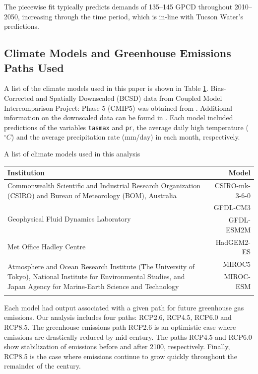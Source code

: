 \documentclass[opre,nonblindrev]{informs3} %
\begin{document}
The piecewise fit typically predicts demands of 135--145 GPCD throughout 2010--2050, increasing through the time period, which is in-line with Tucson Water's predictions.


\subsection{Climate Models and Greenhouse Emissions Paths Used}

A list of the climate models used in this paper is shown in Table \ref{tb:climate_models}.
Bias-Corrected and Spatially Downscaled (BCSD) data from Coupled Model Intercomparison Project: Phase 5 (CMIP5) was obtained from \citep{cmip5}.
Additional information on the downscaled data can be found in \citep{bcsdreclamation}.
Each model included predictions of the variables \texttt{tasmax} and \texttt{pr}, the average daily high temperature ($^\circ C$) and the average precipitation rate (mm/day) in each month, respectively.

\begin{table}
	\TABLE
	{
		A list of climate models used in this analysis
		\label{tb:climate_models}
	}
	{\begin{tabular}{p{}|r}
		\hline
		Institution & Model \\
		\hline
		\hline
		Commonwealth Scientific and Industrial Research Organization (CSIRO) and Bureau of Meteorology (BOM), Australia & CSIRO-mk-3-6-0 \\
		\hline
		\multirow{2}{*}{Geophysical Fluid Dynamics Laboratory} & GFDL-CM3 \\
		 & GFDL-ESM2M \\
		\hline
		Met Office Hadley Centre & HadGEM2-ES \\
		\hline
		\multirow{3}{*}{\vbox{Atmosphere and Ocean Research Institute (The University of Tokyo), National Institute for Environmental Studies, and Japan Agency for Marine-Earth Science and Technology}}  & MIROC5 \\
		 & MIROC-ESM \\
		 & \\
		\hline
	\end{tabular}}
	{}
\end{table}

Each model had output associated with a given path for future greenhouse gas emissions.
Our analysis includes four paths: RCP2.6, RCP4.5, RCP6.0 and RCP8.5.
The greenhouse emissions path RCP2.6 is an optimistic case where emissions are drastically reduced by mid-century.
The paths RCP4.5 and RCP6.0 show stabilization of emissions before and after 2100, respectively.
Finally, RCP8.5 is the case where emissions continue to grow quickly throughout the remainder of the century.
\end{document}
